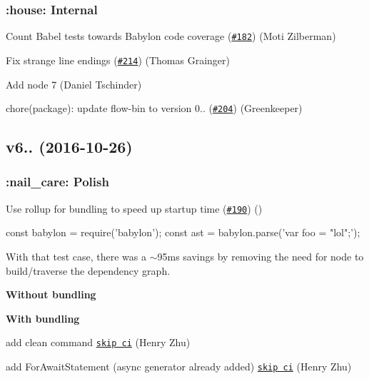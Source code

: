 \subsubsection*{\+:house\+: Internal}


\begin{DoxyItemize}
\item Count Babel tests towards Babylon code coverage (\href{https://github.com/babel/babylon/pull/182}{\tt \#182}) (Moti Zilberman)
\item Fix strange line endings (\href{https://github.com/babel/babylon/pull/214}{\tt \#214}) (Thomas Grainger)
\item Add node 7 (Daniel Tschinder)
\item chore(package)\+: update flow-\/bin to version 0.. (\href{https://github.com/babel/babylon/pull/204}{\tt \#204}) (Greenkeeper)
\end{DoxyItemize}

\subsection*{v6.. (2016-\/10-\/26)}

\subsubsection*{\+:nail\+\_\+care\+: Polish}


\begin{DoxyItemize}
\item Use rollup for bundling to speed up startup time (\href{https://github.com/babel/babylon/pull/190}{\tt \#190}) (\href{https://github.com/DrewML}{\tt })
\end{DoxyItemize}


\begin{DoxyCode}
const babylon = require('babylon');
const ast = babylon.parse('var foo = "lol";');
\end{DoxyCode}


With that test case, there was a $\sim$95ms savings by removing the need for node to build/traverse the dependency graph.

{\bfseries Without bundling} 

{\bfseries With bundling} 


\begin{DoxyItemize}
\item add clean command \href{[#201](https://github.com/babel/babylon/pull/201)}{\tt skip ci} (Henry Zhu)
\item add For\+Await\+Statement (async generator already added) \href{[#196](https://github.com/babel/babylon/pull/196)}{\tt skip ci} (Henry Zhu)
\end{DoxyItemize}

